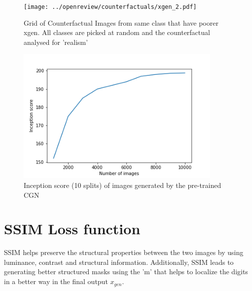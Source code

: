 \begin{figure}[ht!]
\centering 
    \texttt{[image: ../openreview/counterfactuals/xgen\_2.pdf]}
    \caption{Grid of Counterfactual Images from same class that have poorer x{gen}.
    All classes are picked at random and the counterfactual analysed for 'realism'}
    \label{fig:poor_counterfactuals}
\end{figure}

\begin{figure}[h!]
    \centering
    \includegraphics[width=10cm]{../openreview/images/inception.png}
    \caption{Inception score (10 splits) of images generated by the pre-trained CGN}
    \label{fig:inception}
\end{figure}

\newpage
\section{SSIM Loss function}
SSIM \cite{wang2004image} helps preserve the structural properties between the two images by using luminance, contrast and structural information. Additionally, SSIM \cite{wang2004image} leads to generating better structured masks using the 'm' that helps to localize the digits in a better way in the final output $x_{gen}$.

